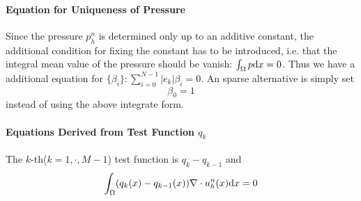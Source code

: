 \paragraph{Equation for Uniqueness of Pressure} Since the pressure $p_h^n$ is determined only up to an additive constant, 
the additional condition for fixing the constant has to be introduced, 
i.e. that the integral mean value of the pressure should be vanish: $\int_\Omega p\mathrm{d} x=0$. Thus we have a additional equation for 
$\{\beta_i\}: \sum_{i=0}^{N-1}|e_k|\beta_i=0$.
An sparse alternative is simply set 
\[\beta_0=1\] 
instead of using the above integrate form.

\paragraph{Equations Derived from Test Function $q_k$} 
The $k$-th($k=1,\cdot,M-1$) test function is $q_k-q_{k-1}$ and 
\begin{equation}\label{eq:equation-testq}
  \int_{\Omega}(q_k(x)-q_{k-1}(x))\nabla\cdot u_h^n(x)\mathrm{d} x=0
\end{equation}

